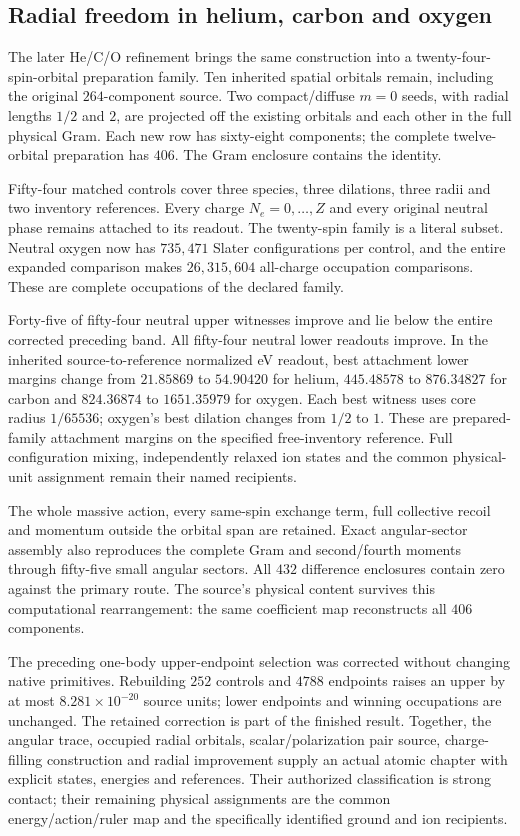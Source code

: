 \subsection{Radial freedom in helium, carbon and oxygen}

The later He/C/O refinement brings the same construction into a twenty-four-spin-orbital preparation family. Ten inherited spatial orbitals remain, including the original $264$-component source. Two compact/diffuse $m=0$ seeds, with radial lengths $1/2$ and $2$, are projected off the existing orbitals and each other in the full physical Gram. Each new row has sixty-eight components; the complete twelve-orbital preparation has $406$. The Gram enclosure contains the identity. 

Fifty-four matched controls cover three species, three dilations, three radii and two inventory references. Every charge $N_e=0,\ldots,Z$ and every original neutral phase remains attached to its readout. The twenty-spin family is a literal subset. Neutral oxygen now has $735{,}471$ Slater configurations per control, and the entire expanded comparison makes $26{,}315{,}604$ all-charge occupation comparisons. These are complete occupations of the declared family.

Forty-five of fifty-four neutral upper witnesses improve and lie below the entire corrected preceding band. All fifty-four neutral lower readouts improve. In the inherited source-to-reference normalized eV readout, best attachment lower margins change from $21.85869$ to $54.90420$ for helium, $445.48578$ to $876.34827$ for carbon and $824.36874$ to $1651.35979$ for oxygen. Each best witness uses core radius $1/65536$; oxygen's best dilation changes from $1/2$ to $1$. These are prepared-family attachment margins on the specified free-inventory reference. Full configuration mixing, independently relaxed ion states and the common physical-unit assignment remain their named recipients.

The whole massive action, every same-spin exchange term, full collective recoil and momentum outside the orbital span are retained. Exact angular-sector assembly also reproduces the complete Gram and second/fourth moments through fifty-five small angular sectors. All $432$ difference enclosures contain zero against the primary route. The source's physical content survives this computational rearrangement: the same coefficient map reconstructs all $406$ components.

The preceding one-body upper-endpoint selection was corrected without changing native primitives. Rebuilding $252$ controls and $4788$ endpoints raises an upper by at most $8.281\times10^{-20}$ source units; lower endpoints and winning occupations are unchanged. The retained correction is part of the finished result. Together, the angular trace, occupied radial orbitals, scalar/polarization pair source, charge-filling construction and radial improvement supply an actual atomic chapter with explicit states, energies and references. Their authorized classification is strong contact; their remaining physical assignments are the common energy/action/ruler map and the specifically identified ground and ion recipients.


